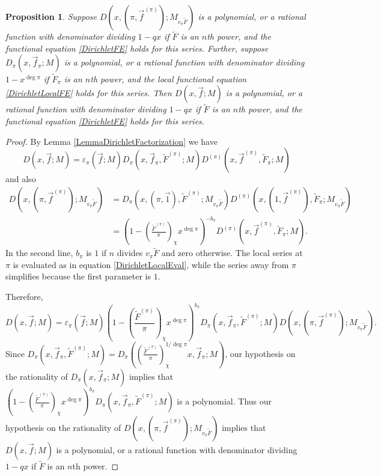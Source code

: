 \documentclass[11pt,letterpaper]{article}
\newtheorem{prop}[theorem]{Proposition}
\theoremstyle{definition}
\theoremstyle{remark}
\numberwithin{equation}{section}
\theoremstyle{dotless}
\newcommand{\res}[2]{\left(\frac{#1}{#2}\right)}
\renewcommand{\tilde}{\widetilde}
\begin{document}
\begin{prop} \label{LocalDirichletImpliesGlobal} Suppose $D(x, (\pi, \vec{f}^{(\pi)}); M_{v_{\pi} \tilde{F}})$ is a polynomial, or a rational function with denominator dividing $1-qx$ if $\tilde{F}$ is an $n$th power, and the functional equation \eqref{DirichletFE} holds for this series. Further, suppose $D_{\pi}(x, \vec{f}_{\pi}; M)$ is a polynomial, or a rational function with denominator dividing $1-x^{\deg \pi}$ if $\tilde{F}_\pi$ is an $n$th power, and the local functional equation \eqref{DirichletLocalFE} holds for this series. Then $D(x, \vec{f}; M)$ is a polynomial, or a rational function with denominator dividing $1-qx$ if $\tilde{F}$ is an $n$th power, and the functional equation \eqref{DirichletFE} holds for this series.
\end{prop}
\begin{proof}
By Lemma \ref{LemmaDirichletFactorization} we have 
\begin{equation*}
    D(x, \vec{f}; M) = \varepsilon_\pi(\vec{f}; M) D_{\pi}(x, \vec{f}_{\pi}, \tilde{F}^{(\pi)}; M) D^{(\pi)}(x, \vec{f}^{(\pi)}, \tilde{F}_{\pi}; M)
\end{equation*}
and also
\begin{equation*}
\begin{split}
    D(x, (\pi, \vec{f}^{(\pi)}); M_{v_\pi \tilde{F}}) &= D_{\pi}(x, (\pi, \vec{1}), \tilde{F}^{(\pi)}; M_{v_\pi \tilde{F}}) D^{(\pi)}(x, (1,\vec{f}^{(\pi)}), \tilde{F}_{\pi}; M_{v_\pi \tilde{F}}) \\
    &= \left(1-\res{\tilde{F}^{(\pi)}}{\pi}_{\chi} x^{\deg \pi}\right)^{-b_{\pi}}D^{(\pi)}(x, \vec{f}^{(\pi)}, \tilde{F}_{\pi}; M).
\end{split}
\end{equation*}
In the second line, $b_{\pi}$ is $1$ if $n$ divides $v_{\pi}\tilde{F}$ and zero otherwise. The local series at $\pi$ is evaluated as in equation \eqref{DirichletLocalEval}, while the series away from $\pi$ simplifies because the first parameter is $1$. 

Therefore, 
\begin{equation} \label{DirichletLocalGlobal1}
    D(x, \vec{f}; M)= \varepsilon_\pi(\vec{f}; M) \left(1-\res{\tilde{F}^{(\pi)}}{\pi}_{\chi} x^{\deg \pi}\right)^{b_{\pi}} D_{\pi}(x, \vec{f}_{\pi}, \tilde{F}^{(\pi)}; M)D(x, (\pi, \vec{f}^{(\pi)}); M_{v_\pi \tilde{F}}).
\end{equation}
Since $D_{\pi}(x, \vec{f}_{\pi}, \tilde{F}^{(\pi)}; M)=D_{\pi}\left(\res{\tilde{F}^{(\pi)}}{\pi}_\chi^{1/\deg \pi} x, \vec{f}_{\pi}; M\right)$, our hypothesis on the rationality of $D_{\pi}(x, \vec{f}_{\pi}; M)$ implies that $\left(1-\res{\tilde{F}^{(\pi)}}{\pi}_{\chi} x^{\deg \pi}\right)^{b_{\pi}} D_{\pi}(x, \vec{f}_{\pi}, \tilde{F}^{(\pi)}; M)$ is a polynomial. Thus our hypothesis on the rationality of $D(x, (\pi, \vec{f}^{(\pi)}); M_{v_\pi \tilde{F}})$ implies that $D(x, \vec{f}; M)$ is a polynomial, or a rational function with denominator dividing $1-qx$ if $\tilde{F}$ is an $n$th power. 


\end{proof}
\end{document}
